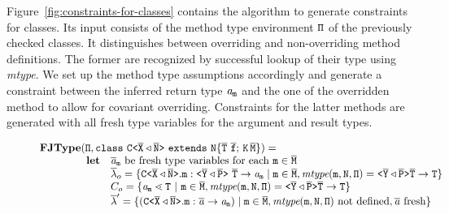 \documentclass[a4paper,USenglish,cleveref, autoref, thm-restate]{lipics-v2021}
\begin{document}
Figure~\ref{fig:constraints-for-classes} contains the algorithm
{\fjtype} to generate constraints for classes. Its input
consists of the method type environment ${\tt \Pi}$ of the previously
checked classes. It distinguishes between overriding and
non-overriding method definitions. The former are recognized by
successful lookup of their type using \textit{mtype}. We set up the
method type assumptions accordingly and generate a constraint between
the inferred return type $\mathit{ a }_{{\tt m}}$ and the one of the
overridden method to allow for covariant overriding.
Constraints for the latter methods are generated with all fresh type
variables for the argument and result types.

\begin{figure}[tp]
  \begin{gather*}
    \begin{array}{@{}l@{}l}
      \fjtype & ({\mv{\Pi}}, \mathtt{class } \ \exptype{C}{\ol{X} \triangleleft \ol{N}} \ \mathtt{ extends } \ \mathtt{N \{ \overline{T} \ \overline{f}; \, K \, \overline{M} \}}) =\\
              & \begin{array}{ll@{}l}
                  \textbf{let} & \overline{\tv{a}}_{\mv m} \text{ be fresh type variables
                                 for each }\mv{m}\in\ol{M} \\
                               & \ol{\methodAssumption}_o = \set{\exptype{C}{\ol{X} \triangleleft \ol{N}}.\mv{m} :
                                 \exptype{}{\ol{Y} \triangleleft \ol{P}}\ \ol{T} \to \tv{a}_{\mv m} \mid \mv{m} \in \ol{M},
                                 \textit{mtype}(\mv{m}, \type{N}, \mv\Pi) = \exptype{}{\ol{Y} \triangleleft \ol{P}} \ol{\type{T}} \to \type{T}}\\
                               & \consSet_o = \set{\tv{a}_{\mv m} \lessdot \type{T} \ |\ \texttt{m} \in \ol{M}, 
                                 \textit{mtype}(\mv{m}, \mv{N}, \mv\Pi) = \exptype{}{\ol{Y} \triangleleft \ol{P}} \ol{\type{T}} \to \type{T}}\\
                               & \ol{\methodAssumption}' = 
                                 \set{ (\exptype{C}{\ol{X} \triangleleft \ol{N}}.\mv{m} : \ol{\tv{a}} \to \tv{a}_{\mv
                                 m}) \mid \mv{m} \in \ol{M},
                                 \textit{mtype} (\mv m, \mv N,
                                 \mv\Pi) \text{ not defined}, \ol{\tv{a}}\ \text{fresh} } \\

\end{array}
\end{array}
\end{gather*}
\end{figure}
\end{document}
